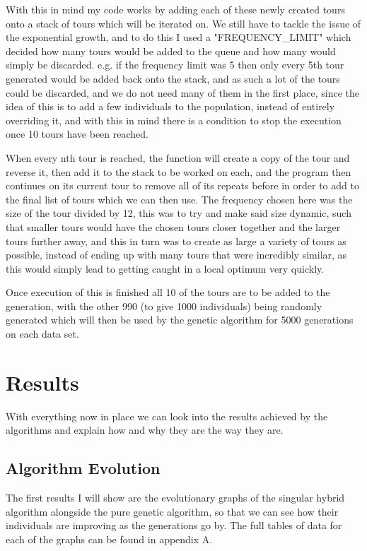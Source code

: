 \documentclass[11pt,a4paper,titlepage]{article}
\begin{document}
With this in mind my code works by adding each of these newly created tours onto a stack of tours which will be iterated on. We still have to tackle the issue of the exponential growth, and to do this I used a "FREQUENCY\_LIMIT" which decided how many tours would be added to the queue and how many would simply be discarded. e.g. if the frequency limit was 5 then only every 5th tour generated would be added back onto the stack, and as such a lot of the tours could be discarded, and we do not need many of them in the first place, since the idea of this is to add a few individuals to the population, instead of entirely overriding it, and with this in mind there is a condition to stop the execution once 10 tours have been reached.

When every nth tour is reached, the function will create a copy of the tour and reverse it, then add it to the stack to be worked on each, and the program then continues on its current tour to remove all of its repeats before in order to add to the final list of tours which we can then use. The frequency chosen here was the size of the tour divided by 12, this was to try and make said size dynamic, such that smaller tours would have the chosen tours closer together and the larger tours further away, and this in turn was to create as large a variety of tours as possible, instead of ending up with many tours that were incredibly similar, as this would simply lead to getting caught in a local optimum very quickly.

Once execution of this is finished all 10 of the tours are to be added to the generation, with the other 990 (to give 1000 individuals) being randomly generated which will then be used by the genetic algorithm for 5000 generations on each data set.

\section{Results}

With everything now in place we can look into the results achieved by the algorithms and explain how and why they are the way they are.

\subsection{Algorithm Evolution}

The first results I will show are the evolutionary graphs of the singular hybrid algorithm alongside the pure genetic algorithm, so that we can see how their individuals are improving as the generations go by. The full tables of data for each of the graphs can be found in appendix A.
\end{document}

